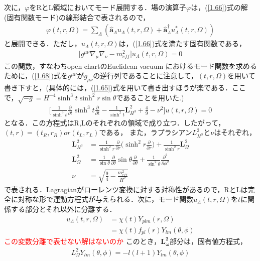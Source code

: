 次に，$\varphi$をRとL領域においてモード展開する．場の演算子$\varphi$は，(\ref{1.66})式の解(固有関数モード)の線形結合で表されるので，
\begin{align}
  \varphi(t,r,\Omega)=\sum_{\Lambda}(\hat{\bm{a}}_{\Lambda}u_{\Lambda}(t,r,\Omega)+\hat{\bm{a}}^{\dagger}_{\Lambda}u^{*}_{\Lambda}(t,r,\Omega))
\end{align}
と展開できる．ただし，$u_{\Lambda}(t,r,\Omega)$は，(\ref{1.66})式を満たす固有関数である，
\begin{align}
  \label{1.68}
\biggl[g^{\mu\nu}\nabla_{\mu}\nabla_{\nu}-m_{eff}^2\biggr]u_{\Lambda}(t,r,\Omega)=0
\end{align}
この関数，すなわちopen chartのEuclidean vacuum におけるモード関数を求めるために，(\ref{1.68})式を$g^{\mu\nu}$が$g_{\mu\nu}$の逆行列であることに注意して，$(t,r,\Omega)$を用いて書き下すと，(具体的には，(\ref{1.65})式を用いて書き出すほうが楽である．ここで，$\sqrt{-g}=H^{-4}\sinh^3t\sinh^2r\sin\theta$であることを用いた.)
\begin{align}
  \biggl[\frac{1}{\sinh^3t}\frac{\partial}{\partial t}\sinh^3t\frac{\partial}{\partial t}-\frac{1}{\sinh^2t}\bm{L}^2_{H^3}+\frac{4}{9}-\nu^2\biggr]u(t,r,\Omega)=0
\end{align}
となる．この方程式はR,Lのそれぞれの領域で成り立つ．したがって，$(t,r)=(t_{R},r_{R}) or (t_{L},r_{L})$である，
また，ラプラシアン$L_{H^3}^2$と$\nu$はそれぞれ，
\begin{align}
  \bm{L}_{H^3}^2&=\frac{1}{\sinh^2r}\frac{\partial}{\partial r}\biggl(\sinh^2r\frac{\partial}{\partial r}\biggr)+\frac{1}{\sinh^2r}\bm{L}_{\Omega}^2 \\
  \bm{L}_{\Omega}^2&=\frac{1}{\sin\theta}\frac{\partial}{\partial \theta}\sin{\theta}\frac{\partial}{\partial \theta}+\frac{1}{\sin^2{\theta}}
  \frac{\partial^2}{\partial \phi^2} \\
  \nu&=\sqrt{\frac{9}{4}-\frac{m^2_{eff}}{H^{2}}}
\end{align}
で表される．Lagragianがローレンツ変換に対する対称性があるので，RとLは完全に対称な形で運動方程式が与えられる．次に，モード関数$u_{\Lambda}(t,r,\Omega)$を$t$に関係する部分とそれ以外に分離する．
\begin{align}
  u_{\Lambda}(t,r,\Omega)&=\chi(t)Y_{plm}(r,\Omega)\\
  &=\chi(t)f_{pl}(r)Y_{lm}(\theta,\phi)
 \end{align}
 \textcolor{red}{この変数分離で表せない解はないのか}
このとき，$\bm{L_{\omega}^2}$部分は，固有値方程式，
\begin{align}
  L_{\Omega}^2Y_{lm}(\theta,\phi)=-l(l+1)Y_{lm}(\theta,\phi)
\end{align}
